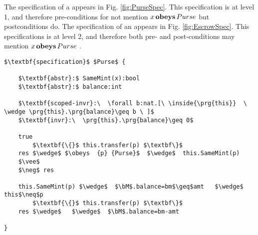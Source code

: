
The specification of  a  appears in Fig. \ref{fig:PurseSpec}. This specification is at level 1, and therefore pre-conditions for not mention $x\, \textbf{obeys} \, Purse$ but postconditions do.
The specification of  an   appears in Fig. \ref{fig:EscrowSpec}. This specifications is at level 2, and therefore both pre- and post-conditions may mention  $x\, \textbf{obeys} \, Purse$ .

\newcommand{\sMT}{sellerM} 
\newcommand{\bMT}{buyerM}
\newcommand{\sGT}{sellerG} 
\newcommand{\bGT}{buyerG}
\newcommand{\sM}{\prg{\sMT}}
\newcommand{\bM}{\prg{\bMT}}
\newcommand{\sG}{\prg{\sGT}}
\newcommand{\bG}{\prg{\sGT}}

\begin{figure*}[t]
\begin{lstlisting}[mathescape=true, language=Chainmail, frame=lines]
$\textbf{specification}$ $Purse$ {
    
    $\textbf{abstr}:$ SameMint(x):bool
    $\textbf{abstr}:$ balance:int
    
    $\textbf{scoped-invr}:\  \forall b:nat.[\ \inside{\prg{this}}  \ \wedge \prg{this}.\prg{balance}\geq b \ ]$
    $\textbf{invr}:\  \prg{this}.\prg{balance}\geq 0$       
     
    true  
        $\textbf{\{}$ this.transfer(p) $\textbf\}$
    res $\wedge$ $\obeys  {p} {Purse}$  $\wedge$  this.SameMint(p)
    $\vee$
    $\neg$ res

    this.SameMint(p) $\wedge$  $\bM$.balance=bm$\geq$amt   $\wedge$ this$\neq$p
        $\textbf{\{}$ this.transfer(p) $\textbf\}$
    res $\wedge$   $\wedge$  $\bM$.balance=bm-amt 
     
}

\end{lstlisting}
\caption{Specification of  $Purse$ -- Incomplete}
\label{fig:PurseSpec}
 \end{figure*}





